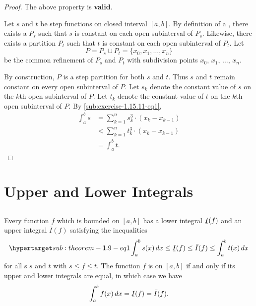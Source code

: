 \documentclass{report}
\begin{document}
  \begin{proof}
    The above property is \textbf{valid}.

    \vspace{6pt}

    Let $s$ and $t$ be step functions on closed interval $[a, b]$.
    By definition of a , there exists a
       $P_s$ such that $s$ is constant on each open
      subinterval of $P_s$.
    Likewise, there exists a partition $P_t$ such that $t$ is constant on each
      open subinterval of $P_t$.
    Let $$P = P_s \cup P_t = \{x_0, x_1, \ldots, x_n\}$$ be the common
      refinement of $P_s$ and $P_t$ with subdivision points $x_0$, $x_1$,
      $\ldots$, $x_n$.

    By construction, $P$ is a step partition for both $s$ and $t$.
    Thus $s$ and $t$ remain constant on every open subinterval of $P$.
    Let $s_k$ denote the constant value of $s$ on the $k$th open subinterval of
      $P$.
    Let $t_k$ denote the constant value of $t$ on the $k$th open subinterval of
      $P$.
    By \eqref{sub:exercise-1.15.11-eq1},
      \begin{align*}
        \int_a^b s
          & = \sum_{k=1}^n s_k^3 \cdot (x_k - x_{k-1}) \\
          & < \sum_{k=1}^n t_k^3 \cdot (x_k - x_{k-1}) \\
          & = \int_a^b t.
      \end{align*}
  \end{proof}

\section{Upper and Lower Integrals}%

\subsection{}%

  \begin{theorem}[1.9]
    Every function $f$ which is bounded on $[a, b]$ has a lower integral
      $\ubar{I}(f)$ and an upper integral $\overline{I}(f)$ satisfying the
      inequalities
      \begin{equation}
        \hyperlabel{sub:theorem-1.9-eq1}
        \int_a^b s(x) \mathop{dx} \leq \ubar{I}(f) \leq
          \bar{I}(f) \leq \int_a^b t(x) \mathop{dx}
      \end{equation}
      for all s $s$ and $t$ with $s \leq f \leq t$.
    The function $f$ is  on $[a, b]$ if and only if
      its upper and lower integrals are equal, in which case we have
      $$\int_a^b f(x) \mathop{dx} = \ubar{I}(f) = \bar{I}(f).$$
  \end{theorem}
\end{document}

